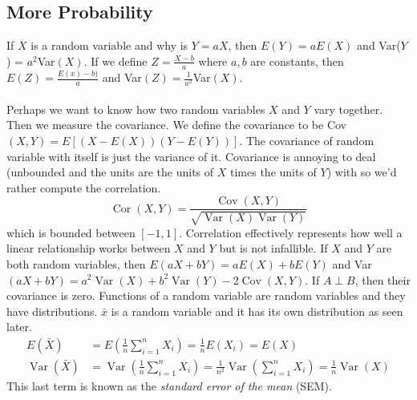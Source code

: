 \documentclass{article}
\begin{document}
\subsection{More Probability}
If $X$ is a random variable and why is $Y=aX$, then $E(Y) =aE(X)$ and Var($Y$) = $a^2$Var$(X)$. If we define $Z = \frac{X-b}{a}$ where $a,b$ are constants, then $E(Z) = \frac{E(x)-b)}{a}$ and Var$(Z) = \frac{1}{a^2}$Var$(X)$.\\\\
Perhaps we want to know how two random variables $X$ and $Y$ vary together. Then we measure the covariance. We define the covariance to be Cov$(X,Y)=E[(X-E(X))(Y-E(Y))]$. The covariance of random variable with itself is just the variance of it. Covariance is annoying to deal (unbounded and the units are the units of $X$ times the units of $Y$) with so we'd rather compute the correlation. 
\begin{equation*}
    \operatorname{Cor}(X,Y) = \frac{\operatorname{Cov}(X,Y)}{\sqrt{\operatorname{Var}(X)\operatorname{Var}(Y)}}
\end{equation*}
which is bounded between $[-1,1]$. Correlation effectively represents how well a linear relationship works between $X$ and $Y$ but is not infallible. If $X$ and $Y$ are both random variables, then $E(aX+bY) = aE(X)+bE(Y)$ and Var$(aX+bY) = a^2 \operatorname{Var}(X)+b^2 \operatorname{Var}(Y) -2\operatorname{Cov}(X,Y) $. If $A\perp B$, then their covariance is zero. Functions of a random variable are random variables and they have distributions. $\bar x$ is a random variable and it has its own distribution as seen later. 
\begin{equation*}
    \begin{split}
        E(\bar X) &= E\left( \frac{1}{n}\sum^n_{i=1} X_i\right) = \frac{1}{n}E(X_i) = E(X) \\
        \operatorname{Var}(\bar X) &= \operatorname{Var}\left(\frac{1}{n} \sum^n_{i=1}X_i \right) = \frac{1}{n^2} \operatorname{Var}\left( \sum^n_{i=1}X_i \right) = \frac{1}{n}\operatorname{Var}(X)
    \end{split}
\end{equation*}
This last term is known  as the \emph{standard error of the mean} (SEM).  
\end{document}
